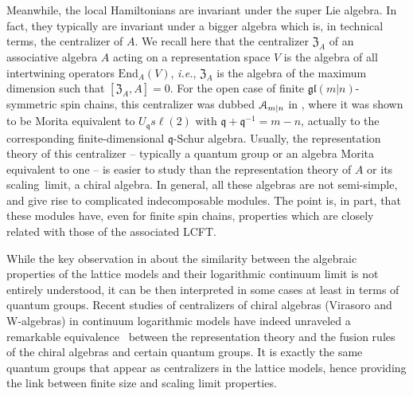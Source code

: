 \documentclass[11pt]{article}
\newcommand{\scal}{scaling~}
\newcommand{\q}{\mathfrak{q}}
\newcommand{\LQG}{U_{\q} s\ell(2)}
\newcommand{\Endo}{\mathrm{End}}
\newcommand{\gl}{\mathfrak{gl}}
\newcommand{\chV}{V}
\newcommand{\cent}{\mathfrak{Z}}
\theoremstyle{definition}
\begin{document}
Meanwhile, the local Hamiltonians are invariant under the super Lie
algebra. In fact, they typically are invariant under a bigger algebra
which is, in technical terms, the centralizer of $A$. We recall here
that the centralizer $\cent_A$ of an associative algebra $A$ acting on a
representation space $\chV$ is the algebra of all intertwining
operators $\Endo_{A}(\chV)$, {\it i.e.}, $\cent_A$  is the algebra of the maximum dimension
such that $[\cent_{A},A]=0$. For the open case of finite $\gl(m|n)$-symmetric
spin chains, this centralizer was dubbed ${{\cal A}_{m|n}}$ in
\cite{ReadSaleur07-1}, where it was shown to be Morita equivalent to
$\LQG$ with $\q+\q^{-1}=m-n$, actually to the corresponding finite-dimensional $\q$-Schur algebra. Usually, the representation theory of
this centralizer -- typically a quantum group or an algebra Morita
equivalent to one -- is easier to study than the representation theory
of $A$ or its \scal limit, a chiral algebra. In general, all these
algebras are not semi-simple, and give rise to complicated
indecomposable modules. The point is, in part, that these modules have, even for finite spin chains, properties which are closely related with those
of the associated LCFT.

While the key observation in \cite{ReadSaleur07-1,Pearceetal} about the similarity between the algebraic properties of the lattice models and their
logarithmic continuum limit is not entirely understood, it can be
then  interpreted in some cases at least in terms of quantum groups. Recent studies of  centralizers of chiral algebras
(Virasoro and W-algebras)  in continuum  logarithmic models
have  indeed unraveled a remarkable equivalence~\cite{[FGST2],[FGST4],BFGT} between
the representation theory  and the fusion rules of the chiral algebras and
certain quantum groups. It is exactly the same quantum groups  that appear as centralizers in the lattice models, hence providing the link between finite size and scaling limit
properties.

\bigskip
\end{document}
